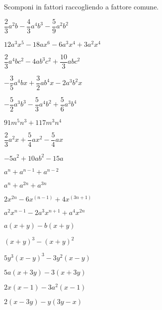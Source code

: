 \begin{esercizio}
\label{ese:div.011}
Scomponi in fattori raccogliendo a fattore comune.
\begin{multicols}{2}
\begin{enumeratea}
 \item $\dfrac{2}{3}a^{2}b-\dfrac{4}{3}a^{4}b^{3}-\dfrac{5}{9}a^{2}b^{2}$
 \item $12a^{3}x^{5}-18ax^{6}-6a^{3}x^{4}+3a^{2}x^{4}$
 \item $\dfrac{2}{3}a^{4}bc^{2}-4ab^{3}c^{2}+\dfrac{10}{3}abc^{2}$
 \item $-{\dfrac{3}{5}}a^{4}bx+\dfrac{3}{2}ab^{4}x-2a^{3}b^{2}x$
 \item $-{\dfrac{5}{2}}a^{3}b^{3}-\dfrac{5}{3}a^{4}b^{2}+\dfrac{5}{6}a^{3}b^{4}$
 \item $91m^{5}n^{3}+117m^{3}n^{4}$
 \item $\dfrac{2}{3}a^{2}x+\dfrac{5}{4}ax^{2}-\dfrac{5}{4}ax$
 \item $-5a^{2}+10ab^{2}-15a$
 \item $a^{n}+a^{n-1}+a^{n-2}$
 \item $a^{n}+a^{2n}+a^{3n}$
 \item $2x^{2n}-6x^{(n-1)}+4x^{(3n+1)}$
 \item $a^{2}x^{n-1}-2a^{3}x^{n+1}+a^{4}x^{2n}$
 \item $a(x+y)-b(x+y)$
 \item $(x+y)^{3}-(x+y)^{2}$
 \item $5y^{3}(x-y)^{3}-3y^{2}(x-y)$
 \item $5a(x+3y)-3(x+3y)$
 \item $2x(x-1)-3a^{2}(x-1)$
 \item $2(x-3y)-y(3y-x)$
\end{enumeratea}
\end{multicols}
\end{esercizio}


